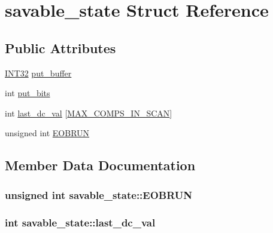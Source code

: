 \hypertarget{structsavable__state}{}\section{savable\+\_\+state Struct Reference}
\label{structsavable__state}
\subsection*{Public Attributes}
\begin{DoxyCompactItemize}
\item 
\hyperlink{jmorecfg_8h_a0cb58e7e6f0bad369840a52e54a56ae0}{I\+N\+T32} \hyperlink{structsavable__state_a71fdab6bc3ab791e85f61179045da4dd}{put\+\_\+buffer}
\item 
int \hyperlink{structsavable__state_a767d7a21d1bd5bee01108b947bfc9fbf}{put\+\_\+bits}
\item 
int \hyperlink{structsavable__state_a828b78727611f4ff5353d24cf7230d85}{last\+\_\+dc\+\_\+val} \mbox{[}\hyperlink{jpeglib_8h_adc7013da016c19051dc623fb3d8b35b4}{M\+A\+X\+\_\+\+C\+O\+M\+P\+S\+\_\+\+I\+N\+\_\+\+S\+C\+A\+N}\mbox{]}
\item 
unsigned int \hyperlink{structsavable__state_a23c64b6c9ba0c84041e1a0533c2312cb}{E\+O\+B\+R\+U\+N}
\end{DoxyCompactItemize}


\subsection{Member Data Documentation}
\hypertarget{structsavable__state_a23c64b6c9ba0c84041e1a0533c2312cb}{}
\subsubsection[{E\+O\+B\+R\+U\+N}]{\setlength{\rightskip}{0pt plus 5cm}unsigned int savable\+\_\+state\+::\+E\+O\+B\+R\+U\+N}\label{structsavable__state_a23c64b6c9ba0c84041e1a0533c2312cb}
\hypertarget{structsavable__state_a828b78727611f4ff5353d24cf7230d85}{}
\subsubsection[{last\+\_\+dc\+\_\+val}]{\setlength{\rightskip}{0pt plus 5cm}int savable\+\_\+state\+::last\+\_\+dc\+\_\+val}\label{structsavable__state_a828b78727611f4ff5353d24cf7230d85}
\hypertarget{structsavable__state_a767d7a21d1bd5bee01108b947bfc9fbf}{}
